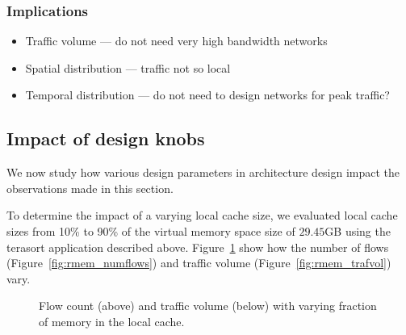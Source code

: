 \subsubsection{Implications}
\label{ssec:implications}

\begin{itemize}[leftmargin=*]
	\itemsep0em
	\item Traffic volume --- do not need very high bandwidth networks
	\item Spatial distribution --- traffic not so local
	\item Temporal distribution --- do not need to design networks for peak traffic?
\end{itemize}		

\subsection{Impact of design knobs}
\label{ssec:knobs}
We now study how various design parameters in \dis architecture design impact the observations made in this section. 


To determine the impact of a varying local cache size, we evaluated local cache sizes from 10\% to 90\% of the virtual memory space size of $29.45$GB using the terasort application described above. Figure~\ref{fig:rmem} show how the number of flows (Figure~\ref{fig:rmem_numflows}) and traffic volume (Figure~\ref{fig:rmem_trafvol}) vary. 

\begin{figure}
\centering
{}
\caption{Flow count (above) and traffic volume (below) with varying fraction of memory in the local cache.}
\label{fig:rmem}
\end{figure}



